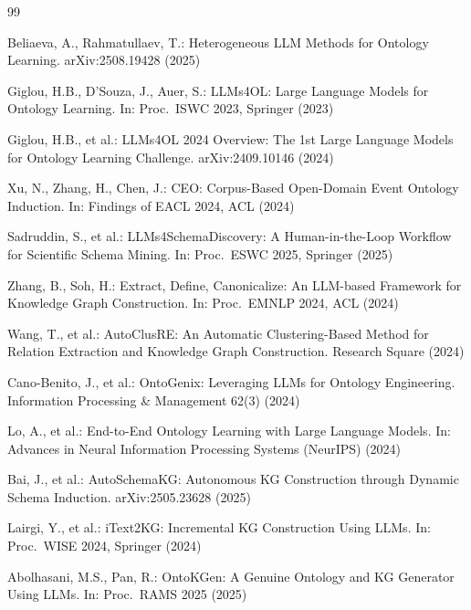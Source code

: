 \documentclass[runningheads,a4paper]{llncs}
\begin{document}

\begin{thebibliography}{99}

Beliaeva, A., Rahmatullaev, T.:
Heterogeneous LLM Methods for Ontology Learning.
arXiv:2508.19428 (2025)

Giglou, H.B., D'Souza, J., Auer, S.:
LLMs4OL: Large Language Models for Ontology Learning.
In: Proc.\ ISWC 2023, Springer (2023)

Giglou, H.B., et al.:
LLMs4OL 2024 Overview: The 1st Large Language Models for Ontology
Learning Challenge.
arXiv:2409.10146 (2024)

Xu, N., Zhang, H., Chen, J.:
CEO: Corpus-Based Open-Domain Event Ontology Induction.
In: Findings of EACL 2024, ACL (2024)

Sadruddin, S., et al.:
LLMs4SchemaDiscovery: A Human-in-the-Loop Workflow for Scientific
Schema Mining. In: Proc.\ ESWC 2025, Springer (2025)

Zhang, B., Soh, H.:
Extract, Define, Canonicalize: An LLM-based Framework for Knowledge
Graph Construction.
In: Proc.\ EMNLP 2024, ACL (2024)

Wang, T., et al.: AutoClusRE: An Automatic Clustering-Based Method for
Relation Extraction and Knowledge Graph Construction. Research Square
(2024)

Cano-Benito, J., et al.: OntoGenix: Leveraging LLMs for Ontology
Engineering. Information Processing \& Management 62(3) (2024)

Lo, A., et al.:
End-to-End Ontology Learning with Large Language Models.
In: Advances in Neural Information Processing Systems (NeurIPS) (2024)

Bai, J., et al.: AutoSchemaKG: Autonomous KG Construction through
Dynamic Schema Induction. arXiv:2505.23628 (2025)

Lairgi, Y., et al.: iText2KG: Incremental KG Construction Using
LLMs. In: Proc.\ WISE 2024, Springer (2024)

Abolhasani, M.S., Pan, R.: OntoKGen: A Genuine Ontology and KG
Generator Using LLMs. In: Proc.\ RAMS 2025 (2025)


\end{thebibliography}
\end{document}
